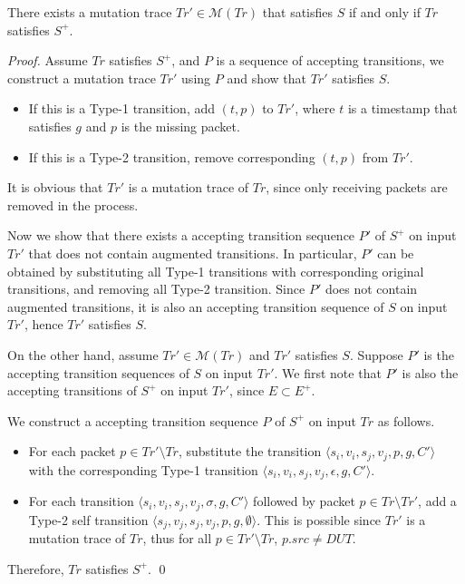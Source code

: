 \begin{theorem}
  There exists a mutation trace $Tr' \in \mathcal{M}(Tr)$ that satisfies $S$ if
  and only if $Tr$ satisfies $S^+$.
 \label{the:equivalent}
\end{theorem}
\begin{proof}
  Assume $Tr$ satisfies $S^+$, and $P$ is a sequence of accepting transitions,
  we construct a mutation trace $Tr'$ using $P$ and show that $Tr'$ satisfies
  $S$.

  \begin{itemize}
    \item If this is a Type-1 transition, add $(t, p)$ to $Tr'$, where $t$ is a
      timestamp that satisfies $g$ and $p$ is the missing packet.
    \item If this is a Type-2 transition, remove corresponding $(t, p)$ from
      $Tr'$.
  \end{itemize}
  It is obvious that $Tr'$ is a mutation trace of $Tr$, since only receiving
  packets are removed in the process.

  Now we show that there exists a accepting transition sequence $P'$ of $S^+$ on
  input $Tr'$ that does not contain augmented transitions.  In particular, $P'$
  can be obtained by substituting all Type-1 transitions with corresponding
  original transitions, and removing all Type-2 transition.  Since $P'$ does not
  contain augmented transitions, it is also an accepting transition sequence of
  $S$ on input $Tr'$, hence $Tr'$ satisfies $S$.

  On the other hand, assume $Tr' \in \mathcal{M}(Tr)$ and $Tr'$ satisfies $S$.
  Suppose $P'$ is the accepting transition sequences of $S$ on input $Tr'$.
  We first note that $P'$ is also the accepting transitions of $S^+$ on input
  $Tr'$, since $E \subset E^+$.

  We construct a accepting transition sequence $P$ of $S^+$ on input $Tr$ as
  follows.
  \begin{itemize}
    \item For each packet $p \in Tr' \setminus Tr$, substitute the transition
      $\langle s_i, v_i, s_j, v_j, p, g, C'\rangle$ with the corresponding Type-1
      transition $\langle s_i, v_i, s_j, v_j, \epsilon, g, C'\rangle$.
    \item For each transition $\langle s_i, v_i, s_j, v_j, \sigma, g, C'\rangle$
      followed by packet $p \in Tr\setminus Tr'$, add a Type-2 self
      transition $\langle s_j, v_j, s_j, v_j, p, g, \emptyset\rangle$. This is
      possible since $Tr'$ is a mutation trace of $Tr$, thus  for all $p \in Tr'
      \setminus Tr$, $p.src \ne DUT$.
  \end{itemize}
  Therefore, $Tr$ satisfies $S^+$.
  \qed
\end{proof}

